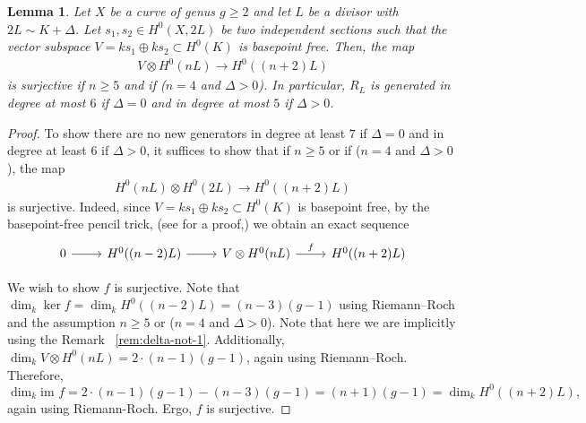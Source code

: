 \documentclass{amsart}
\theoremstyle{plain}
\newtheorem{lem}[thm]{Lemma}
\theoremstyle{definition}
\theoremstyle{remark}
\numberwithin{equation}{section}
\newcommand\im{\text{im }}
\begin{document}
\begin{lem}
\label{lem:semicanonical_generation}
Let $X$ be a curve of genus $g \geq 2$ and let $L$ be a divisor with $2 L \sim K + \Delta$. Let $s_1,s_2 \in H^0(X,2L)$ be two independent sections such that the vector subspace $V = ks_1 \oplus k s_2 \subset H^0(K)$ is basepoint free. Then, the map
\begin{align*}
	V \otimes H^0(nL) \rightarrow H^0((n+2)L)
\end{align*}
is surjective if $n \geq 5$ and if {\rm(}$n = 4$ and $\Delta > 0${\rm)}.
In particular, $R_L$ is generated in degree at most $6$ if $\Delta = 0$ and in degree at most $5$ if $\Delta > 0$.
\end{lem}
\begin{proof}
To show there are no new generators in degree at least $7$ if $\Delta = 0$ and in degree at least $6$ if $\Delta > 0$, it suffices to show that if $n \geq 5$ or if ($n = 4$ and $\Delta > 0$), the map
\begin{align*}
	H^0(nL) \otimes H^0(2L) \rightarrow H^0((n+2)L)
\end{align*}
is surjective. Indeed, since $V= ks_1 \oplus k s_2 \subset H^0(K)$ is basepoint free, by the basepoint-free pencil trick, (see \cite[Lemma 2.6]{saint-donat:proj} for a proof,) we obtain an exact sequence
$$\begin{tikzcd}
0 \ar r & H^0((n-2)L) \ar r & V \otimes H^0(nL) \ar{r}{f} & H^0((n+2)L)
\end{tikzcd}$$


We wish to show $f$ is surjective.
Note that $\dim_k \ker f = \dim_k H^0((n-2)L) = (n-3)(g - 1)$ using Riemann--Roch and the assumption $n \geq 5$ or ($n = 4$ and $\Delta > 0$). Note that here we are implicitly using the Remark ~\ref{rem:delta-not-1}.
Additionally, $\dim_k V \otimes H^0(nL) = 2 \cdot (n- 1)(g - 1)$, again using Riemann--Roch.
Therefore, $$\dim_k \im f = 2 \cdot (n- 1)(g - 1) -(n-3)(g - 1) = (n+ 1)(g - 1) = \dim_k H^0((n+2)L),$$
again using Riemann-Roch. Ergo, $f$ is surjective.
\end{proof}
\end{document}
